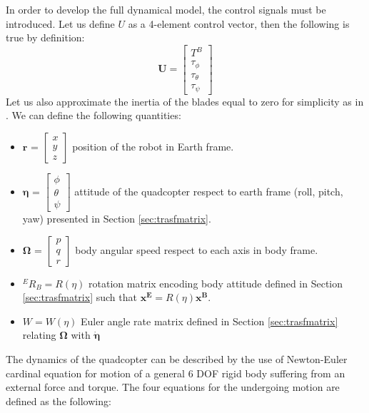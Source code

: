 In order to develop the full dynamical model, the control signals must be introduced. Let us define $U$ as a 4-element control vector, then the following is true by definition:
\begin{equation}
\textbf{U} = \begin{bmatrix}
T^B\\\tau_\phi \\ \tau_\theta \\ \tau_\psi
\end{bmatrix}
\label{eq:inputs}
\end{equation}
Let us also approximate the inertia of the blades equal to zero for simplicity as in \cite{Vendittelli}. We can define the following quantities:\begin{itemize}
\item $\boldsymbol{r}$ = $\begin{bmatrix} x\\y\\z\end{bmatrix}$ position of the robot in Earth frame.
\item $\boldsymbol{\eta}$ = $\begin{bmatrix} \phi\\\theta\\\psi\end{bmatrix}$ attitude of the quadcopter respect to earth frame (roll, pitch, yaw) presented in Section \ref{sec:trasfmatrix}.
\item $\boldsymbol{\Omega}$ = $\begin{bmatrix} p\\q\\r\end{bmatrix}$ body angular speed respect to each axis in body frame.
\item ${}^ER_B = R(\eta)$ rotation matrix encoding body attitude defined in Section \ref{sec:trasfmatrix} such that $\boldsymbol{x^E} =  R(\eta) \boldsymbol{x^B}$.

\item $W = W(\eta)$ Euler angle rate matrix defined in Section \ref{sec:trasfmatrix} relating $\boldsymbol{\Omega}$ with $\dot{\boldsymbol{\eta}}$ 
\end{itemize}
The dynamics of the quadcopter can be described by the use of Newton-Euler cardinal equation for motion of a general 6 DOF rigid body suffering from an external force and torque. The four equations for the undergoing motion are defined as the following:


